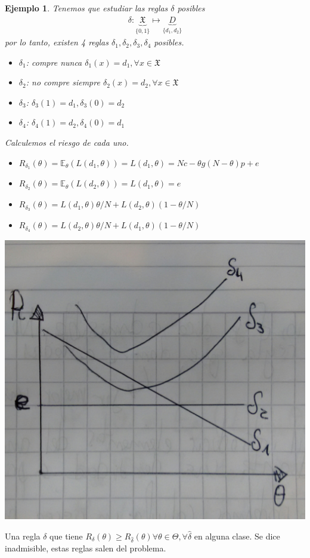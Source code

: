 \documentclass[10pt]{article}
\theoremstyle{plain}
\newtheorem{ej}{Ejemplo}
\theoremstyle{definition}
\begin{document}
\begin{ej}
Tenemos que estudiar las reglas $\delta$ posibles
\begin{align*}
\delta \colon \underbrace{\mathfrak{X}}_{\{0,1\}} \mapsto \underbrace{D}_{\{d_{1},d_{2}\}}
\end{align*}
por lo tanto, existen 4 reglas $\delta_{1}, \delta_{2}, \delta_{3}, \delta_{4}$ posibles.
\begin{itemize}
\item $\delta_{1}$: compre nunca $\delta_{1}(x) = d_{1}, \forall x\in\mathfrak{X}$
\item $\delta_{2}$: no compre siempre $\delta_{2}(x) = d_{2}, \forall x\in\mathfrak{X}$
\item $\delta_{3}$: $\delta_{3}(1) = d_{1}, \delta_{3}(0) = d_{2}$
\item $\delta_{4}$: $\delta_{4}(1) = d_{2}, \delta_{4}(0) = d_{1}$
\end{itemize}
Calculemos el riesgo de cada uno.
\begin{itemize}
\item $R_{\delta_{1}}(\theta) = \mathbb{E}_{\theta}(L(d_{1},\theta)) = L(d_{1},\theta) = Nc-\theta g (N-\theta)p + e$
\item $R_{\delta_{2}}(\theta) = \mathbb{E}_{\theta}(L(d_{2},\theta)) = L(d_{1},\theta) = e$
\item $R_{\delta_{3}}(\theta) = L(d_{1},\theta)\theta/N + L(d_{2},\theta) \left(1-\theta/N\right)$
\item $R_{\delta_{4}}(\theta) = L(d_{2},\theta)\theta/N + L(d_{1},\theta) \left(1-\theta/N\right)$
\end{itemize}
\begin{center}
\includegraphics[scale=0.1]{imagenes/riesgo.jpg}
\end{center}
\end{ej}
Una regla $\delta$ que tiene $R_{\delta}(\theta) \ge  R_{\hat{\delta}}(\theta) \forall \theta \in \Theta, \forall \hat{\delta}$ en alguna clase. Se dice inadmisible, estas reglas salen del problema.\\
\end{document}
